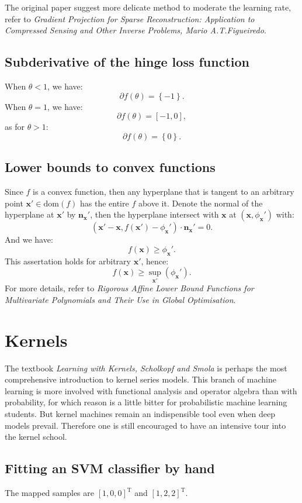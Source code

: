 \documentclass[UTF8]{ctexart}
\begin{document}
The original paper suggest more delicate method to moderate the learning rate, refer to \emph{Gradient Projection for Sparse Reconstruction: Application to Compressed Sensing and Other Inverse Problems, Mario A.T.Figueiredo}.

\subsection{Subderivative of the hinge loss function}
When $\theta<1$, we have:
$$\partial f(\theta)=\left\{ -1 \right\}.$$
When $\theta=1$, we have:
$$\partial f(\theta)=[ -1,0 ],$$
as for $\theta>1$:
$$\partial f(\theta)=\left\{ 0 \right\}.$$

\subsection{Lower bounds to convex functions}
Since $f$ is a convex function, then any hyperplane that is tangent to an arbitrary point $\textbf{x}'\in\text{dom}(f)$ has the entire $f$ above it.
Denote the normal of the hyperplane at $\textbf{x}'$ by $\textbf{n}_{\textbf{x}}'$, then the hyperplane intersect with $\textbf{x}$ at $(\textbf{x},\phi_{\textbf{x}}')$ with:
$$(\textbf{x}'-\textbf{x},f(\textbf{x}')-\phi_{\textbf{x}}')\cdot \textbf{n}_{\textbf{x}}'=0.$$
And we have:
$$f(\textbf{x})\geq \phi_{\textbf{x}}'.$$
This assertation holds for arbitrary $\textbf{x}'$, hence:
$$f(\textbf{x})\geq \sup_{\textbf{x}'}(\phi_{\textbf{x}}').$$
For more details, refer to \emph{Rigorous Affine Lower Bound Functions for Multivariate Polynomials and Their Use in Global Optimisation}.

\newpage
\section{Kernels}
The textbook \emph{Learning with Kernels, Scholkopf and Smola} is perhaps the most comprehensive introduction to kernel series models.
This branch of machine learning is more involved with functional analysis and operator algebra than with probability, for which reason is a little bitter for probabilistic machine learning students.
But kernel machines remain an indispensible tool even when deep models prevail. 
Therefore one is still encouraged to have an intensive tour into the kernel school.
\subsection{Fitting an SVM classifier by hand}
The mapped samples are $[1,0,0]^{\text{T}}$ and $[1,2,2]^{\text{T}}$.
\end{document}
